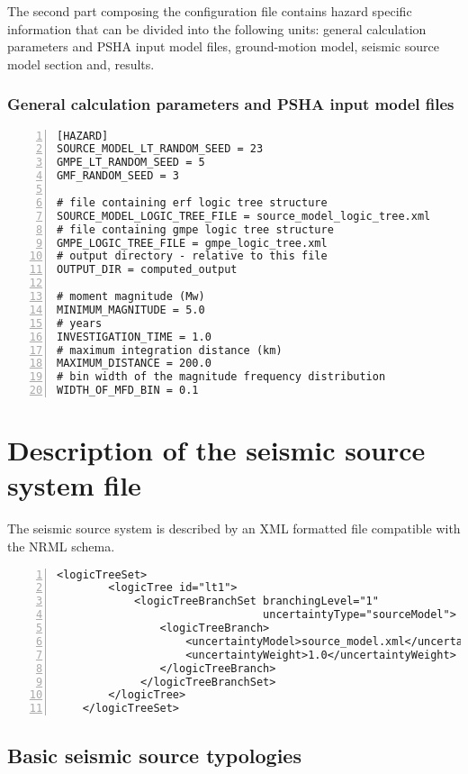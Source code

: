 The second part composing the configuration file contains hazard 
specific information that can be divided into the following units: 
general calculation parameters and PSHA input model files, 
ground-motion model, seismic source model section and, results.
%
%
\subsubsection{General calculation parameters and PSHA input model files}
%
\begin{Verbatim}[baselinestretch=1,fontsize=\small,numbers=left,frame=single]
[HAZARD]
SOURCE_MODEL_LT_RANDOM_SEED = 23
GMPE_LT_RANDOM_SEED = 5
GMF_RANDOM_SEED = 3

# file containing erf logic tree structure
SOURCE_MODEL_LOGIC_TREE_FILE = source_model_logic_tree.xml
# file containing gmpe logic tree structure
GMPE_LOGIC_TREE_FILE = gmpe_logic_tree.xml
# output directory - relative to this file
OUTPUT_DIR = computed_output

# moment magnitude (Mw)
MINIMUM_MAGNITUDE = 5.0
# years
INVESTIGATION_TIME = 1.0
# maximum integration distance (km)
MAXIMUM_DISTANCE = 200.0
# bin width of the magnitude frequency distribution
WIDTH_OF_MFD_BIN = 0.1
\end{Verbatim}

%
\section{Description of the seismic source system file}
The seismic source system is described by an XML formatted file 
compatible with the NRML schema.
%
\begin{Verbatim}[baselinestretch=1,fontsize=\small,numbers=left,frame=single]
	<logicTreeSet>
        <logicTree id="lt1">
            <logicTreeBranchSet branchingLevel="1" 
                                uncertaintyType="sourceModel">
                <logicTreeBranch>
                    <uncertaintyModel>source_model.xml</uncertaintyModel>
                    <uncertaintyWeight>1.0</uncertaintyWeight>
                </logicTreeBranch>
             </logicTreeBranchSet>
        </logicTree>
    </logicTreeSet>
\end{Verbatim}
%
\subsection{Basic seismic source typologies }


